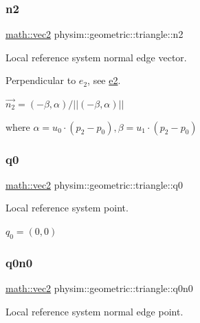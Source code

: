 \subsubsection{\texorpdfstring{n2}{n2}}
{\footnotesize\ttfamily \hyperlink{structphysim_1_1math_1_1vec2}{math\+::vec2} physim\+::geometric\+::triangle\+::n2\hspace{0.3cm}{\ttfamily [private]}}



Local reference system normal edge vector. 

Perpendicular to $e_2$, see \hyperlink{classphysim_1_1geometric_1_1triangle_a9e2c598ece34f8df7f37558ab09c297c}{e2}.

$\vec{n_2} = (-\beta, \alpha)/ || (-\beta, \alpha) || $

where $\alpha = u_0\cdot(p_2-p_0), \beta = u_1\cdot(p_2-p_0)$ \mbox{\label{classphysim_1_1geometric_1_1triangle_a3833e8f8b38f28edc60ac2fa28dc72f3}} 
\subsubsection{\texorpdfstring{q0}{q0}}
{\footnotesize\ttfamily \hyperlink{structphysim_1_1math_1_1vec2}{math\+::vec2} physim\+::geometric\+::triangle\+::q0\hspace{0.3cm}{\ttfamily [private]}}



Local reference system point. 

$q_0 = (0,0)$ \mbox{\label{classphysim_1_1geometric_1_1triangle_a8a3bf081df4faf1d5d47445f4d0f4e1d}} 
\subsubsection{\texorpdfstring{q0n0}{q0n0}}
{\footnotesize\ttfamily \hyperlink{structphysim_1_1math_1_1vec2}{math\+::vec2} physim\+::geometric\+::triangle\+::q0n0\hspace{0.3cm}{\ttfamily [private]}}



Local reference system normal edge point. 

